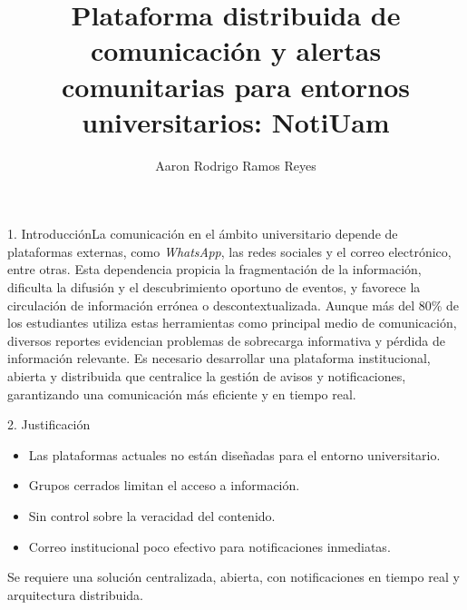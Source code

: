 \documentclass[final]{beamer}
\title{Plataforma distribuida de comunicación y alertas comunitarias para entornos universitarios: NotiUam}
\author{Aaron Rodrigo Ramos Reyes}
\institute{Universidad Autónoma Metropolitana, Unidad Cuajimalpa}
\begin{document}
\begin{frame}[t]
    \vspace{0.1cm}  %
    
    

    \begin{tcolorbox}[colframe=white, colback=white, height=0.1cm, left=0pt, right=0pt, top=0pt, bottom=0pt, boxsep=0pt]
    \end{tcolorbox}

    \begin{minipage}[t]{0.48\textwidth}
        \begin{block}{\Large 1. Introducción}La comunicación en el ámbito universitario depende de plataformas externas, como \textit{WhatsApp}, las redes sociales y el correo electrónico, entre otras. Esta dependencia propicia la fragmentación de la información, dificulta la difusión y el descubrimiento oportuno de eventos, y favorece la circulación de información errónea o descontextualizada. Aunque más del 80\% de los estudiantes utiliza estas herramientas como principal medio de comunicación, diversos reportes evidencian problemas de sobrecarga informativa y pérdida de información relevante. Es necesario desarrollar una plataforma institucional, abierta y distribuida que centralice la gestión de avisos y notificaciones, garantizando una comunicación más eficiente y en tiempo real.
    \end{block}

        \begin{block}{\Large 2. Justificación}
            
            \begin{itemize}[leftmargin=*, itemsep=1pt]
                \item Las plataformas actuales no están diseñadas para el entorno universitario.
                \item Grupos cerrados limitan el acceso a información.
                \item Sin control sobre la veracidad del contenido.
                \item Correo institucional poco efectivo para notificaciones inmediatas.
            \end{itemize}
            Se requiere una solución centralizada, abierta, con notificaciones en tiempo real y arquitectura distribuida.
        \end{block}

        \vspace{0.2cm}


\end{minipage}
\end{frame}
\end{document}
